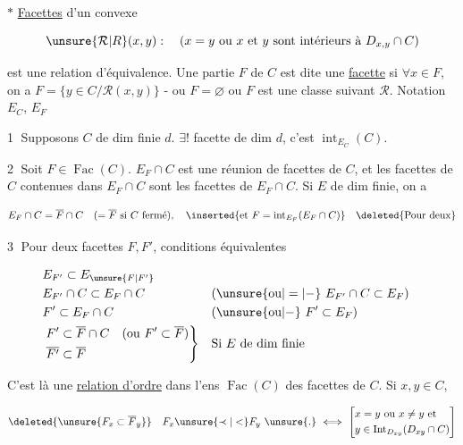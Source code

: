 
$\ast$ \uline{Facettes} d'un convexe

\[
\unsure{\mathcal R|R}(x,y):\quad (x=y\ \text{ou}\ x\ \text{et}\ y\ \text{sont intérieurs à}\ D_{x,y}\cap C)
\]

est une relation d'équivalence. Une partie $F$ de $C$ est dite une \uline{facette} si $\forall x\in F$, on a $F=\{y\in C/\mathcal R(x,y)\}$ -  ou  $F=\varnothing$  ou $F$ est une classe suivant $\mathcal R$. Notation $E_C$, $E_F$


\textcircled{1} Supposons $C$ de dim finie $d$. $\exists!$ facette de dim $d$, c'est $\operatorname{int}_{E_C}(C)$.

\textcircled{2} Soit $F\in\operatorname{Fac}(C)$.   $E_F\cap C$ est une réunion de facettes de $C$, et  les facettes de $C$ contenues dans $E_F\cap C$ sont les facettes de $E_F\cap C$. Si $E$ de dim finie, on a

\[
 E_F\cap C=\overline F\cap C\quad(=\overline F\ \text{si }C\text{ fermé}),\quad \inserted{\text{et }F=\operatorname{int}_{E_F}(E_F\cap C)}\quad\deleted{\text{Pour deux}}
\]

\textcircled{3} Pour deux facettes $F,F'$, conditions équivalentes

\[
\begin{aligned}
&E_{F'}\subset E_{\unsure{F|F'}}\\
&E_{F'}\cap C\subset E_F\cap C &&(\unsure{\text{ou}|=|-}\ E_{F'}\cap C\subset E_F)\\
&F'\subset E_F\cap C &&(\unsure{\text{ou}|-}\ F'\subset E_F)\\
&\left.\begin{aligned}
F'&\subset\overline F\cap C &(\text{ou }F'\subset\overline F)\\
\overline{F'}&\subset\overline F
\end{aligned}\right\} &&\text{Si } E \text{ de dim finie}
\end{aligned}
\]

C'est là une \uline{relation d'ordre} dans l'ens $\operatorname{Fac}(C)$ des facettes de $C$. Si $x,y\in{C}$, 

\[
\deleted{\unsure{F_x\subset\overline F_y}}\quad F_x\unsure{\prec|<} F_y\ \unsure{.}\ \Longleftrightarrow\
\left[\begin{aligned} &x=y\ \text{ou}\ x\ne y\ \text{et}\\
&y\in\operatorname{Int}_{D_{xy}}(D_{xy}\cap C)\end{aligned}\right]
\]

